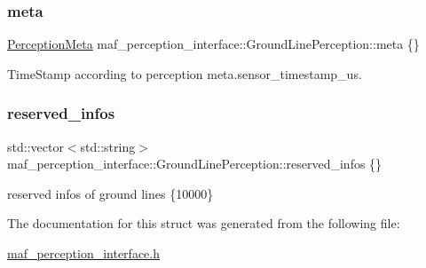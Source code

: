 \subsubsection{\texorpdfstring{meta}{meta}}
{\footnotesize\ttfamily \hyperlink{structmaf__perception__interface_1_1PerceptionMeta}{Perception\+Meta} maf\+\_\+perception\+\_\+interface\+::\+Ground\+Line\+Perception\+::meta \{\}}



Time\+Stamp according to perception meta.\+sensor\+\_\+timestamp\+\_\+us. 

\mbox{\label{structmaf__perception__interface_1_1GroundLinePerception_a60d118ccc3db6add394082a6bae2a77c}} 
\subsubsection{\texorpdfstring{reserved\+\_\+infos}{reserved\_infos}}
{\footnotesize\ttfamily std\+::vector$<$std\+::string$>$ maf\+\_\+perception\+\_\+interface\+::\+Ground\+Line\+Perception\+::reserved\+\_\+infos \{\}}



reserved infos of ground lines \{10000\} 



The documentation for this struct was generated from the following file\+:\begin{DoxyCompactItemize}
\item 
\hyperlink{maf__perception__interface_8h}{maf\+\_\+perception\+\_\+interface.\+h}\end{DoxyCompactItemize}
